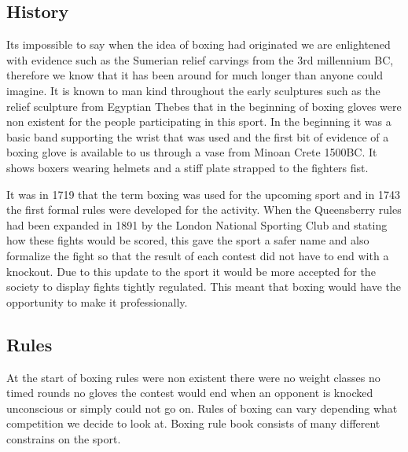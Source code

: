 \documentclass[a4paper,12pt]{report}
\begin{document}
\subsection{History}
Its impossible to say when the idea of boxing had originated we are enlightened with evidence such as the Sumerian relief carvings from the 3rd millennium BC, therefore we know that it has been around for much longer than anyone could imagine.\newline
It is known to man kind throughout the early sculptures such as the relief sculpture from Egyptian Thebes that in the beginning of boxing gloves were non existent for the people participating in this sport.\newline
In the beginning it was a basic band supporting the wrist that was used and the first bit of evidence of a boxing glove is available to us through a vase from Minoan Crete 1500BC. It shows boxers wearing helmets and a stiff plate strapped to the fighters fist.
\cite{Boxing}

It was in 1719 that the term boxing was used for the upcoming sport and in 1743 the first formal rules were developed for the activity. When the Queensberry rules had been expanded in 1891 by the London National Sporting Club and stating how these fights would be scored, this gave the sport a safer name and also formalize the fight so that the result of each contest did not have to end with a knockout.
\cite{modernBoxing}
Due to this update to the sport it would be more accepted for the society to display fights tightly regulated. This meant that boxing would have the opportunity to make it professionally. 

\subsection{Rules}
At the start of boxing rules were non existent there were no weight classes no timed rounds no gloves the contest would end when an opponent is knocked unconscious or simply could not go on. 
Rules of boxing can vary depending what competition we decide to look at. Boxing rule book consists of many different constrains on the sport.\linebreak
\end{document}
